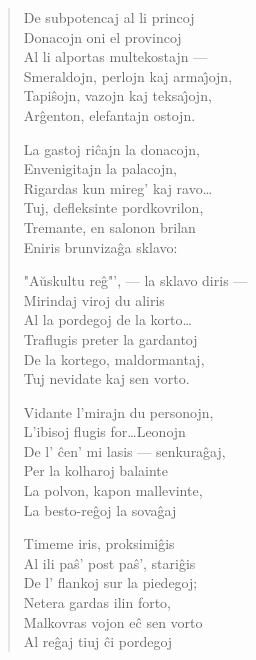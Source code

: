 \begin{verse}
                     De subpotencaj al li princoj\\
                     Donacojn oni el provincoj\\
                     Al li alportas multekostajn ---\\
                     Smeraldojn, perlojn kaj arma\^{\j}ojn,\\
                     Tapi\^sojn, vazojn kaj teksa\^{\j}ojn,\\
                     Ar\^genton, elefantajn ostojn.

                     La gastoj ri\^cajn la donacojn,\\
                     Envenigitajn la palacojn,\\
                     Rigardas kun mireg' kaj ravo\dots\\
                     Tuj, defleksinte pordkovrilon,\\
                     Tremante, en salonon brilan\\
                     Eniris brunviza\^ga sklavo:

                     "A\u uskultu re\^g"', --- la sklavo diris ---\\
                     Mirindaj viroj du aliris\\
                     Al la pordegoj de la korto\dots\\
                     Traflugis preter la gardantoj\\
                     De la kortego, maldormantaj,\\
                     Tuj nevidate kaj sen vorto.

                     Vidante l'mirajn du personojn,\\
                     L'ibisoj flugis for\dots Leonojn\\
                     De l' \^cen' mi lasis --- senkura\^gaj,\\
                     Per la kolharoj balainte\\
                     La polvon, kapon mallevinte,\\
                     La besto-re\^goj la sova\^gaj

                     Timeme iris, proksimi\^gis\\
                     Al ili pa\^s' post pa\^s', stari\^gis\\
                     De l' flankoj sur la piedegoj;\\
                     Netera gardas ilin forto,\\
                     Malkovras vojon e\^c sen vorto\\
                     Al re\^gaj tiuj \^ci pordegoj


\end{verse}
